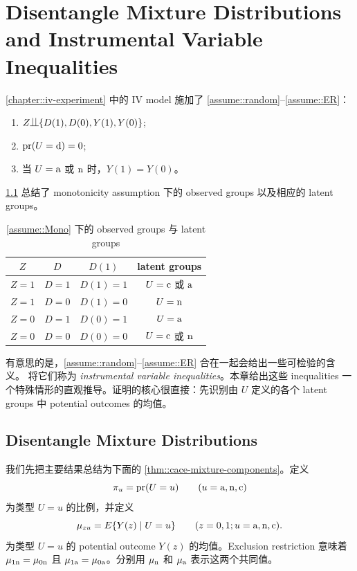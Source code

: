  
\chapter{Disentangle Mixture Distributions and Instrumental Variable Inequalities}
 \label{chapter::iv-inequalities}

 
 \cref{chapter::iv-experiment} 中的 IV model 施加了 \cref{assume::random}--\cref{assume::ER}：
 \begin{enumerate}
 \item
 $Z\ind \{D(1), D(0) ,Y(1), Y(0)   \}$;
 \item
 $\textup{pr}(U = \textup{d}) = 0$;
 \item 
 当 $U=\textup{a}$ 或 $\textup{n}$ 时，$Y(1) = Y(0)$。
 \end{enumerate}


\cref{table::obs-latent} 总结了 monotonicity assumption 下的 observed groups 以及相应的 latent groups。


\begin{table}[h]
\centering
\caption{\cref{assume::Mono} 下的 observed groups 与 latent groups}\label{table::obs-latent}
\begin{tabular}{cccc}
\hline 
$Z$ & $D$ & $D(1)$ & latent groups \\
\hline 
$Z=1$ & $D=1$ & $D(1) = 1$ & $U = \textup{c}$ 或 $\textup{a}$ \\
$Z=1$ & $D=0$ & $D(1) = 0$ & $U = \textup{n}$ \\ 
$Z=0$ & $D=1$ & $D(0) = 1$ & $U = \textup{a}$  \\ 
$Z=0$ & $D=0$ & $D(0) = 0$ & $U = \textup{c}$ 或 $\textup{n}$ \\
\hline 
\end{tabular}
\end{table}


有意思的是，\cref{assume::random}--\cref{assume::ER} 合在一起会给出一些可检验的含义。\citet{balke1997bounds} 将它们称为 {\it instrumental variable inequalities}。本章给出这些 inequalities 一个特殊情形的直观推导。证明的核心很直接：先识别由 $U$ 定义的各个 latent groups 中 potential outcomes 的均值。

\section{Disentangle Mixture Distributions}
\label{sec::disentangle-mixtures}


我们先把主要结果总结为下面的 \cref{thm::cace-mixture-components}。定义
$$
\pi_u = \textup{pr}(U = u) \quad  \quad  (u=\textup{a}, \textup{n}, \textup{c}) 
$$
为类型 $U=u$ 的比例，并定义
$$
\mu_{zu} = E\{  Y(z) \mid U = u\}\quad  \quad (z=0,1;u=\textup{a}, \textup{n}, \textup{c}) .
$$ 
为类型 $U=u$ 的 potential outcome $Y(z)$ 的均值。Exclusion restriction 意味着 $\mu_{1\textup{n}} = \mu_{0\textup{n}} $ 且 $\mu_{1\textup{a}} = \mu_{0\textup{a}} $。分别用 $\mu_{\textup{n}}$ 和 $\mu_{\textup{a}} $ 表示这两个共同值。

